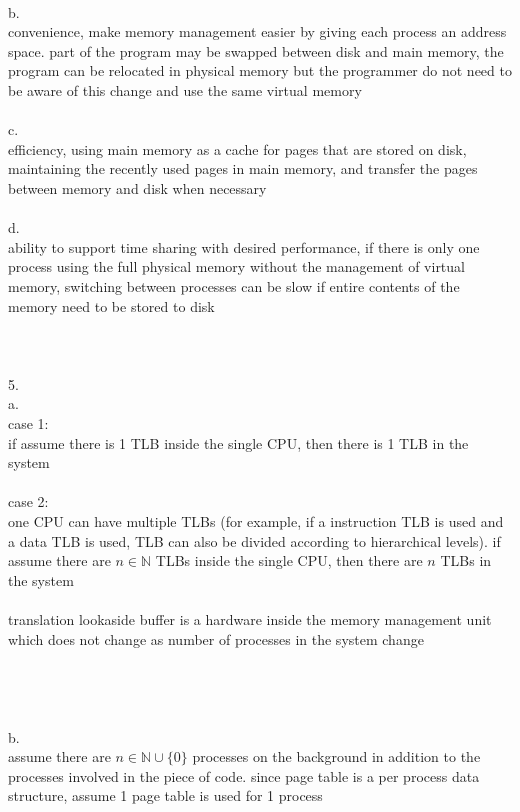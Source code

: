 \documentclass[12pt, border = 4pt, multi]{article} %
\begin{document}
\\
b.\\
convenience, make memory management easier by giving each process an address space. part of the program may be swapped between disk and main memory, the program can be relocated in physical memory but the programmer do not need to be aware of this change and use the same virtual memory\\
\\
c.\\
efficiency, using main memory as a cache for pages that are stored on disk, maintaining the recently used pages in main memory, and transfer the pages between memory and disk when necessary\\
\\
d.\\
ability to support time sharing with desired performance, if there is only one process using the full physical memory without the management of virtual memory, switching between processes can be slow if entire contents of the memory need to be stored to disk\\
\\
\\
\\
5.\\
a.\\
case 1:\\
if assume there is 1 TLB inside the single CPU, then there is 1 TLB in the system\\
\\
case 2:\\
one CPU can have multiple TLBs (for example, if a instruction TLB is used and a data TLB is used, TLB can also be divided according to hierarchical levels). if assume there are $n \in \mathbb{N}$ TLBs inside the single CPU, then there are $n$ TLBs in the system\\
\\
translation lookaside buffer is a hardware inside the memory management unit which does not change as number of processes in the system change\\
\\
\\
\\
\\
b.\\
assume there are $n \in \mathbb{N} \cup \{0\}$ processes on the background in addition to the processes involved in the piece of code. since page table is a per process data structure, assume 1 page table is used for 1 process\\
\end{document}

